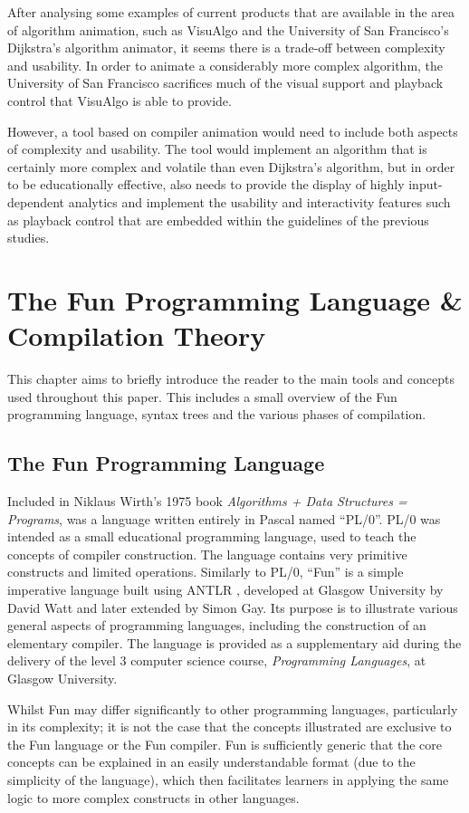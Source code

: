 \documentclass{l4proj}
\begin{document}
After analysing some examples of current products that are available in the area of algorithm animation, such as VisuAlgo and the University of San Francisco's Dijkstra's algorithm animator, it seems there is a trade-off between complexity and usability. In order to animate a considerably more complex algorithm, the University of San Francisco sacrifices much of the visual support and playback control that VisuAlgo is able to provide. 

However, a tool based on compiler animation would need to include both aspects of complexity and usability. The tool would implement an algorithm that is certainly more complex and volatile than even Dijkstra's algorithm, but in order to be educationally effective, also needs to provide the display of highly input-dependent analytics and implement the usability and interactivity features such as playback control that are embedded within the guidelines of the previous studies.

\chapter{The Fun Programming Language \& Compilation Theory}
This chapter aims to briefly introduce the reader to the main tools and concepts used throughout this paper. This includes a small overview of the Fun programming language, syntax trees and the various phases of compilation.

\section{The Fun Programming Language}
Included in Niklaus Wirth's 1975 book {\it Algorithms + Data Structures = Programs}, was a language written entirely in Pascal named ``PL/0''. PL/0 was intended as a small educational programming language, used to teach the concepts of compiler construction. The language contains very primitive constructs and limited operations. Similarly to PL/0, ``Fun'' is a simple imperative language built using ANTLR \cite{antlr}, developed at Glasgow University by David Watt and later extended by Simon Gay. Its purpose is to illustrate various general aspects of programming languages, including the construction of an elementary compiler. The language is provided as a supplementary aid during the delivery of the level 3 computer science course, {\it Programming Languages}, at Glasgow University.

Whilst Fun may differ significantly to other programming languages, particularly in its complexity; it is not the case that the concepts illustrated are exclusive to the Fun language or the Fun compiler. Fun is sufficiently generic that the core concepts can be explained in an easily understandable format (due to the simplicity of the language), which then facilitates learners in applying the same logic to more complex constructs in other languages.
\end{document}
